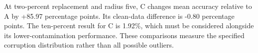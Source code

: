At two-percent replacement and radius five, C changes mean accuracy relative to A by +85.97 percentage points. Its clean-data difference is -0.80 percentage points. The ten-percent result for C is 1.92\%, which must be considered alongside its lower-contamination performance. These comparisons measure the specified corruption distribution rather than all possible outliers.

